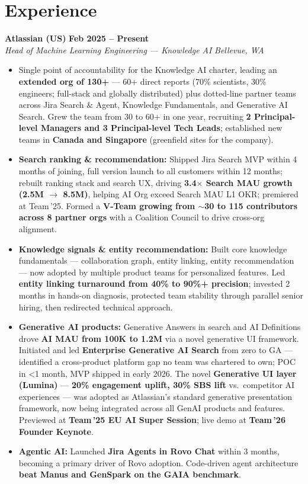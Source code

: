 \documentclass[10.5pt,letterpaper]{article}
\newcommand{\role}[4]{%
  \noindent\textbf{#1} \hfill \textbf{#3}\\
  \textit{#2} \hfill \textit{#4}\par\vspace{2pt}}
\begin{document}
\section*{Experience}

\role{Atlassian (US)}{Head of Machine Learning Engineering --- Knowledge AI}{Feb 2025 -- Present}{Bellevue, WA}
\begin{itemize}
  \item Single point of accountability for the Knowledge AI charter, leading an \textbf{extended org of 130+} — 60+ direct reports (70\% scientists, 30\% engineers; full-stack and globally distributed) plus dotted-line partner teams across Jira Search \& Agent, Knowledge Fundamentals, and Generative AI Search. Grew the team from 30 to 60+ in one year, recruiting \textbf{2 Principal-level Managers and 3 Principal-level Tech Leads}; established new teams in \textbf{Canada and Singapore} (greenfield sites for the company).
  \item \textbf{Search ranking \& recommendation:} Shipped Jira Search MVP within 4 months of joining, full version launch to all customers within 12 months; rebuilt ranking stack and search UX, driving \textbf{3.4$\times$ Search MAU growth (2.5M $\to$ 8.5M)}, helping AI Org exceed Search MAU L1 OKR; premiered at Team\,'25. Formed a \textbf{V-Team growing from $\sim$30 to 115 contributors across 8 partner orgs} with a Coalition Council to drive cross-org alignment.
  \item \textbf{Knowledge signals \& entity recommendation:} Built core knowledge fundamentals — collaboration graph, entity linking, entity recommendation — now adopted by multiple product teams for personalized features. Led \textbf{entity linking turnaround from 40\% to 90\%+ precision}; invested 2 months in hands-on diagnosis, protected team stability through parallel senior hiring, then redirected technical approach.
  \item \textbf{Generative AI products:} Generative Answers in search and AI Definitions drove \textbf{AI MAU from 100K to 1.2M} via a novel generative UI framework. Initiated and led \textbf{Enterprise Generative AI Search} from zero to GA — identified a cross-product platform gap no team was chartered to own; POC in <1 month, MVP shipped in early 2026. The novel \textbf{Generative UI layer (Lumina)} — \textbf{20\% engagement uplift, 30\% SBS lift} vs.\ competitor AI experiences — was adopted as Atlassian's standard generative presentation framework, now being integrated across all GenAI products and features. Previewed at \textbf{Team\,'25 EU AI Super Session}; live demo at \textbf{Team\,'26 Founder Keynote}.
  \item \textbf{Agentic AI:} Launched \textbf{Jira Agents in Rovo Chat} within 3 months, becoming a primary driver of Rovo adoption. Code-driven agent architecture \textbf{beat Manus and GenSpark on the GAIA benchmark}.
\end{itemize}
\end{document}

